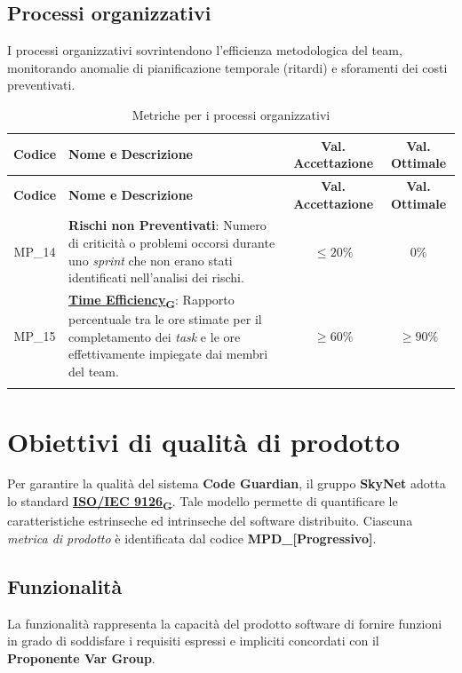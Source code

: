 \documentclass[12pt, a4paper]{article}
\newcommand{\urlglossario}{https://skynetunigroup.github.io/Code_Guardian/Documentazione/PB/glossario_v2.0.0.pdf} %
\newcommand{\glo}[2]{\href{\urlglossario\#nameddest=#2}{#1\textsubscript{G}}}
\newlength{\LargColVal} %
\begin{document}
\subsection{Processi organizzativi}
I processi organizzativi sovrintendono l'efficienza metodologica del team, monitorando anomalie di pianificazione temporale (ritardi) e sforamenti dei costi preventivati.

\renewcommand{\arraystretch}{1.3}
\begin{xltabular}{\textwidth}{|c|X|C{\LargColVal}|C{\LargColVal}|}

    \hline
    \textbf{Codice} & \textbf{Nome e Descrizione} & \textbf{Val. Accettazione} & \textbf{Val. Ottimale} \\ \hline
    \endfirsthead

    \hline
    \textbf{Codice} & \textbf{Nome e Descrizione} & \textbf{Val. Accettazione} & \textbf{Val. Ottimale} \\ \hline
    \endhead

    MP\_14 & \textbf{Rischi non Preventivati}: Numero di criticità o problemi occorsi durante uno \textit{sprint} che non erano stati identificati nell'analisi dei rischi. & $\le 20\%$ & $ 0\%$ \\ \hline
    MP\_15 & \textbf{\glo{Time Efficiency}{time-efficiency}}: Rapporto percentuale tra le ore stimate per il completamento dei \textit{task} e le ore effettivamente impiegate dai membri del team. & $\ge 60\%$ & $\ge 90\%$ \\ \hline

    \caption{Metriche per i processi organizzativi}
    \label{tab:metriche_organizzativi}
\end{xltabular}


\newpage
\section{Obiettivi di qualità di prodotto}

Per garantire la qualità del sistema \textbf{Code Guardian}, il gruppo \textbf{SkyNet} adotta lo standard \textbf{\glo{ISO/IEC 9126}{iso-iec-9126}}. Tale modello permette di quantificare le caratteristiche estrinseche ed intrinseche del software distribuito. Ciascuna \textit{metrica di prodotto} è identificata dal codice \textbf{MPD\_[Progressivo]}.

\subsection{Funzionalità}
La funzionalità rappresenta la capacità del prodotto software di fornire funzioni in grado di soddisfare i requisiti espressi e impliciti concordati con il \textbf{Proponente Var Group}.
\end{document}
